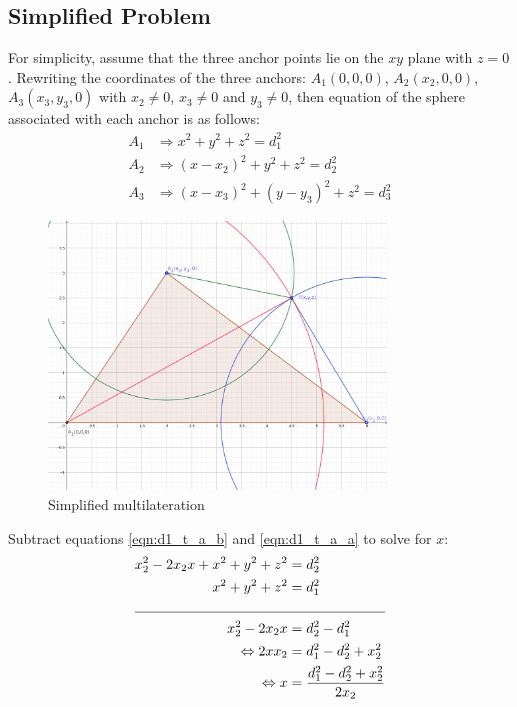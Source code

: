 \documentclass[\main/thesis.tex]{subfiles}
\begin{document}
\subsection{Simplified Problem}
\label{subsection:multilateration_simplified_problem}
For simplicity, assume that the three anchor points lie on the $xy$ plane with $z = 0$. Rewriting the coordinates of the three anchors: $A_1(0,0,0)$, $A_2(x_2,0,0)$, $A_3(x_3,y_3,0)$ with $x_2 \neq 0$, $x_3 \neq 0$ and $y_3 \neq 0$, then equation of the sphere associated with each anchor is as follows:
\begin{subequations}
    \begin{align}
        A_1 &\Rightarrow  x^2 + y^2 + z^2 = d_1^2 \label{eqn:d1_t_a_a}\\
        A_2 &\Rightarrow (x-x_2)^2 + y^2 + z^2 = d_2^2 \label{eqn:d1_t_a_b}\\
        A_3 &\Rightarrow (x-x_3)^2 + (y-y_3)^2 + z^2 = d_3^2 \label{eqn:d1_t_a_c}
    \end{align}
\end{subequations}
\begin{figure}[H]
    \centering
    \includegraphics[width=0.8\textwidth]{simplified_multilateration.png}
    \caption{Simplified multilateration}
    \label{fig:simplified_multilateration}
\end{figure}
Subtract equations \ref{eqn:d1_t_a_b} and \ref{eqn:d1_t_a_a} to solve for $x$:
\begin{equation}
    \begin{split}
        x_2^2 - 2x_2x + x^2 + y^2 + z^2 &= d_2^2\\
        x^2 + y^2 + z^2 &= d_1^2 \\
        \cline{1-2}
        x_2^2 - 2x_2x &= d_2^2 - d_1^2 \\
        \Leftrightarrow 2xx_2 &=  d_1^2 - d_2^2 + x_2^2 \\
        \Leftrightarrow x &= \frac{d_1^2 - d_2^2 + x_2^2}{2x_2}
    \end{split}
    \label{eqn:simplified_multilateration_x}
\end{equation}
\end{document}
